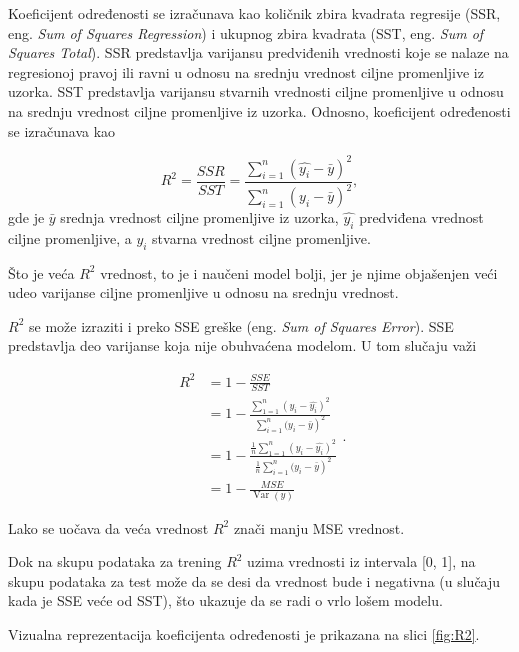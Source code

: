\documentclass[main.tex]{subfiles}
\begin{document}
Koeficijent određenosti se izračunava kao količnik zbira kvadrata regresije (SSR, eng. \textit{Sum of Squares Regression}) i ukupnog zbira kvadrata (SST, eng. \textit{Sum of Squares Total}). SSR predstavlja varijansu predviđenih vrednosti koje se nalaze na regresionoj pravoj ili ravni u odnosu na srednju vrednost ciljne promenljive iz uzorka. SST predstavlja varijansu stvarnih vrednosti ciljne promenljive u odnosu na srednju vrednost ciljne promenljive iz uzorka. Odnosno, koeficijent određenosti se izračunava kao

\[ R^{2} = \frac{SSR}{SST} = \frac{\sum_{i=1}^{n}(\hat{y_i} - \bar{y})^{2}}{\sum_{i=1}^{n}(y_i - \bar{y})^{2}}, \]
gde je $\bar{y}$ srednja vrednost ciljne promenljive iz uzorka, $\hat{y_i}$ predviđena vrednost ciljne promenljive, a $y_i$ stvarna vrednost ciljne promenljive.

Što je veća $R^{2}$ vrednost, to je i naučeni model bolji, jer je njime objašenjen veći udeo varijanse ciljne promenljive u odnosu na srednju vrednost.

$R^{2}$ se može izraziti i preko SSE greške (eng. \textit{Sum of Squares Error}). SSE predstavlja deo varijanse koja nije obuhvaćena modelom. U tom slučaju važi


\[
\begin{aligned}
R^{2} &=1-\frac{S S E}{S S T} \\
&=1-\frac{\sum_{1=1}^{n}\left(y_i-\hat{y_i}\right)^{2}}{\left. \sum_{i=1}^{n}(y_i-\bar{y}\right)^{2}} \\
&=1-\frac{\frac{1}{n} \sum_{1=1}^{n}\left(y_i-\hat{y_i}\right)^{2}}{\left.\frac{1}{n} \sum_{i=1}^{n}(y_i-\bar{y}\right)^{2}} \\
&=1-\frac{MSE}{\operatorname{Var}(y)}
\end{aligned}.
\]

Lako se uočava da veća vrednost $R^{2}$ znači manju MSE vrednost.

Dok na skupu podataka za trening $R^{2}$ uzima vrednosti iz intervala [0, 1], na skupu podataka za test može da se desi da vrednost bude i negativna (u slučaju kada je SSE veće od SST), što ukazuje da se radi o vrlo lošem modelu.

Vizualna reprezentacija koeficijenta određenosti je prikazana na slici \ref{fig:R2}.
\end{document}
